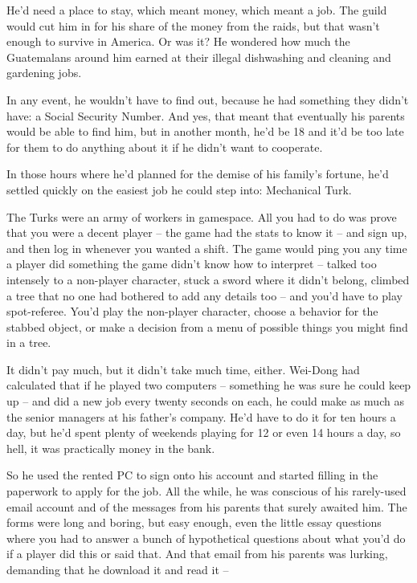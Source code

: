 He'd need a place to stay, which meant money, which meant a job.
The guild would cut him in for his share of the money from the
raids, but that wasn't enough to survive in America. Or was it? He
wondered how much the Guatemalans around him earned at their
illegal dishwashing and cleaning and gardening jobs.

In any event, he wouldn't have to find out, because he had
something they didn't have: a Social Security Number. And yes, that
meant that eventually his parents would be able to find him, but in
another month, he'd be 18 and it'd be too late for them to do
anything about it if he didn't want to cooperate.

In those hours where he'd planned for the demise of his family's
fortune, he'd settled quickly on the easiest job he could step
into: Mechanical Turk.

The Turks were an army of workers in gamespace. All you had to do
was prove that you were a decent player -- the game had the stats
to know it -- and sign up, and then log in whenever you wanted a
shift. The game would ping you any time a player did something the
game didn't know how to interpret -- talked too intensely to a
non-player character, stuck a sword where it didn't belong, climbed
a tree that no one had bothered to add any details too -- and you'd
have to play spot-referee. You'd play the non-player character,
choose a behavior for the stabbed object, or make a decision from a
menu of possible things you might find in a tree.

It didn't pay much, but it didn't take much time, either. Wei-Dong
had calculated that if he played two computers -- something he was
sure he could keep up -- and did a new job every twenty seconds on
each, he could make as much as the senior managers at his father's
company. He'd have to do it for ten hours a day, but he'd spent
plenty of weekends playing for 12 or even 14 hours a day, so hell,
it was practically money in the bank.

So he used the rented PC to sign onto his account and started
filling in the paperwork to apply for the job. All the while, he
was conscious of his rarely-used email account and of the messages
from his parents that surely awaited him. The forms were long and
boring, but easy enough, even the little essay questions where you
had to answer a bunch of hypothetical questions about what you'd do
if a player did this or said that. And that email from his parents
was lurking, demanding that he download it and read it --

